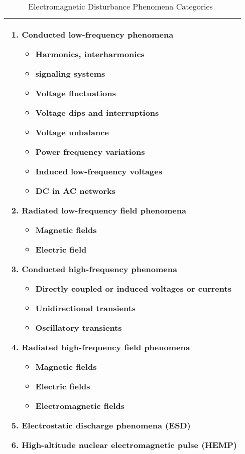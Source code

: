 \begin{table}[!p]
\centering
\renewcommand{\tabcolsep}{0.08cm}
\caption{Electromagnetic Disturbance Phenomena Categories~\cite{iec_61000}}
\begin{tabular}{m{12cm}}
\hline \hline
\begin{enumerate} [itemsep=5pt,topsep=4pt]
\item \textbf{Conducted low-frequency phenomena}
\begin{itemize}[itemsep=5pt,topsep=0pt]
\item Harmonics, interharmonics
\item signaling systems
\item Voltage fluctuations
\item Voltage dips and interruptions
\item Voltage unbalance
\item Power frequency variations
\item Induced low-frequency voltages
\item DC in AC networks
\end{itemize}

\item \textbf{Radiated low-frequency field phenomena}
\begin{itemize}[itemsep=5pt,topsep=0pt]
\item Magnetic fields
\item Electric field
\end{itemize}
\end{enumerate}


\begin{enumerate}[itemsep=5pt,topsep=4pt]
\setcounter{enumi}{2} 
\item \textbf{Conducted high-frequency phenomena}
\begin{itemize}[itemsep=5pt,topsep=0pt]
\item Directly coupled or induced voltages or currents
\item Unidirectional transients
\item Oscillatory transients
\end{itemize}

\item \textbf{Radiated high-frequency field phenomena}
\begin{itemize}[itemsep=5pt,topsep=0pt]
\item Magnetic fields
\item Electric fields
\item Electromagnetic fields
\end{itemize}
\item \textbf{Electrostatic discharge phenomena (ESD)}
\item \textbf{High-altitude nuclear electromagnetic pulse (HEMP)}
\end{enumerate}
\\
\hline
\end{tabular}
\label{tbl:iec_classification}
\vspace{2cm}
\end{table}



